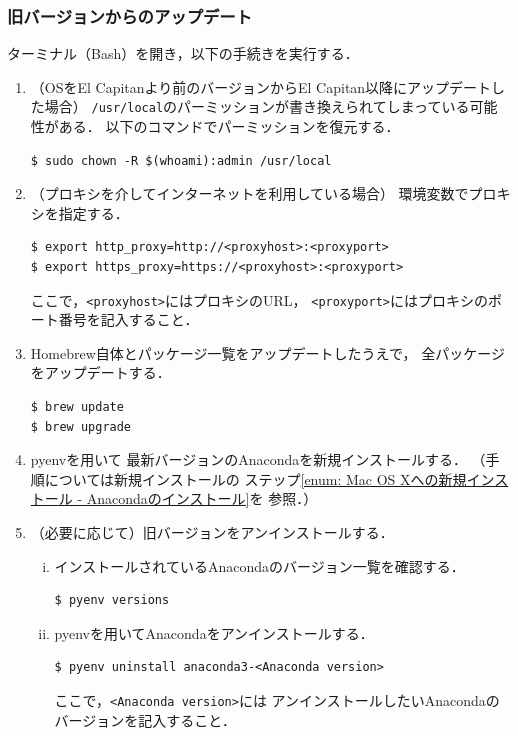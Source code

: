 \subsubsection{旧バージョンからのアップデート}
ターミナル（Bash）を開き，以下の手続きを実行する．
\begin{enumerate}
\item
（OSをEl Capitanより前のバージョンからEl Capitan以降にアップデートした場合）
\verb|/usr/local|のパーミッションが書き換えられてしまっている可能性がある．
以下のコマンドでパーミッションを復元する．
\begin{lstlisting}[style=cmdline]
$ sudo chown -R $(whoami):admin /usr/local
\end{lstlisting}
\item
（プロキシを介してインターネットを利用している場合）
環境変数でプロキシを指定する．
\begin{lstlisting}[style=cmdline]
$ export http_proxy=http://<proxyhost>:<proxyport>
$ export https_proxy=https://<proxyhost>:<proxyport>
\end{lstlisting}
ここで，\verb|<proxyhost>|にはプロキシのURL，
\verb|<proxyport>|にはプロキシのポート番号を記入すること．
\item
Homebrew自体とパッケージ一覧をアップデートしたうえで，
全パッケージをアップデートする．
\begin{lstlisting}[style=cmdline]
$ brew update
$ brew upgrade
\end{lstlisting}
\item
pyenvを用いて
最新バージョンのAnacondaを新規インストールする．
（手順については新規インストールの
ステップ\ref{enum: Mac OS Xへの新規インストール - Anacondaのインストール}を
参照．）
\item
（必要に応じて）旧バージョンをアンインストールする．
\begin{enumerate}[(i)]
\item
インストールされているAnacondaのバージョン一覧を確認する．
\begin{lstlisting}[style=cmdline]
$ pyenv versions
\end{lstlisting}
\item
pyenvを用いてAnacondaをアンインストールする．
\begin{lstlisting}[style=cmdline]
$ pyenv uninstall anaconda3-<Anaconda version>
\end{lstlisting}
ここで，\verb|<Anaconda version>|には
アンインストールしたいAnacondaのバージョンを記入すること．
\end{enumerate}
\end{enumerate}


